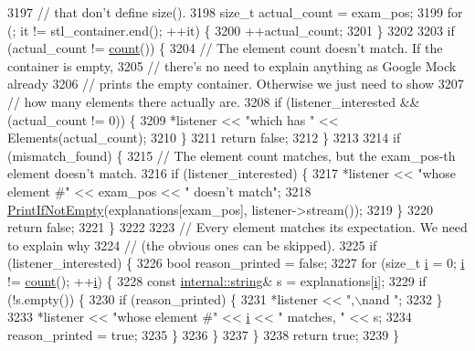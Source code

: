 \begin{DoxyCode}
3197     \textcolor{comment}{// that don't define size().}
3198     \textcolor{keywordtype}{size\_t} actual\_count = exam\_pos;
3199     \textcolor{keywordflow}{for} (; it != stl\_container.end(); ++it) \{
3200       ++actual\_count;
3201     \}
3202 
3203     \textcolor{keywordflow}{if} (actual\_count != \hyperlink{gmock__stress__test_8cc_afd9db40e3361ae09188795e8cbe19752}{count}()) \{
3204       \textcolor{comment}{// The element count doesn't match.  If the container is empty,}
3205       \textcolor{comment}{// there's no need to explain anything as Google Mock already}
3206       \textcolor{comment}{// prints the empty container.  Otherwise we just need to show}
3207       \textcolor{comment}{// how many elements there actually are.}
3208       \textcolor{keywordflow}{if} (listener\_interested && (actual\_count != 0)) \{
3209         *listener << \textcolor{stringliteral}{"which has "} << Elements(actual\_count);
3210       \}
3211       \textcolor{keywordflow}{return} \textcolor{keyword}{false};
3212     \}
3213 
3214     \textcolor{keywordflow}{if} (mismatch\_found) \{
3215       \textcolor{comment}{// The element count matches, but the exam\_pos-th element doesn't match.}
3216       \textcolor{keywordflow}{if} (listener\_interested) \{
3217         *listener << \textcolor{stringliteral}{"whose element #"} << exam\_pos << \textcolor{stringliteral}{" doesn't match"};
3218         \hyperlink{namespacetesting_1_1internal_a77c9e2b66d2b2414db4763971180d53c}{PrintIfNotEmpty}(explanations[exam\_pos], listener->stream());
3219       \}
3220       \textcolor{keywordflow}{return} \textcolor{keyword}{false};
3221     \}
3222 
3223     \textcolor{comment}{// Every element matches its expectation.  We need to explain why}
3224     \textcolor{comment}{// (the obvious ones can be skipped).}
3225     \textcolor{keywordflow}{if} (listener\_interested) \{
3226       \textcolor{keywordtype}{bool} reason\_printed = \textcolor{keyword}{false};
3227       \textcolor{keywordflow}{for} (\textcolor{keywordtype}{size\_t} \hyperlink{gtest__output__test__golden__lin_8txt_a7e98b8a17c0aad30ba64d47b74e2a6c1}{i} = 0; \hyperlink{gtest__output__test__golden__lin_8txt_a7e98b8a17c0aad30ba64d47b74e2a6c1}{i} != \hyperlink{gmock__stress__test_8cc_afd9db40e3361ae09188795e8cbe19752}{count}(); ++\hyperlink{gtest__output__test__golden__lin_8txt_a7e98b8a17c0aad30ba64d47b74e2a6c1}{i}) \{
3228         \textcolor{keyword}{const} \hyperlink{namespacetesting_1_1internal_a8e8ff5b11e64078831112677156cb111}{internal::string}& s = explanations[\hyperlink{gtest__output__test__golden__lin_8txt_a7e98b8a17c0aad30ba64d47b74e2a6c1}{i}];
3229         \textcolor{keywordflow}{if} (!s.empty()) \{
3230           \textcolor{keywordflow}{if} (reason\_printed) \{
3231             *listener << \textcolor{stringliteral}{",\(\backslash\)nand "};
3232           \}
3233           *listener << \textcolor{stringliteral}{"whose element #"} << \hyperlink{gtest__output__test__golden__lin_8txt_a7e98b8a17c0aad30ba64d47b74e2a6c1}{i} << \textcolor{stringliteral}{" matches, "} << s;
3234           reason\_printed = \textcolor{keyword}{true};
3235         \}
3236       \}
3237     \}
3238     \textcolor{keywordflow}{return} \textcolor{keyword}{true};
3239   \}
\end{DoxyCode}


